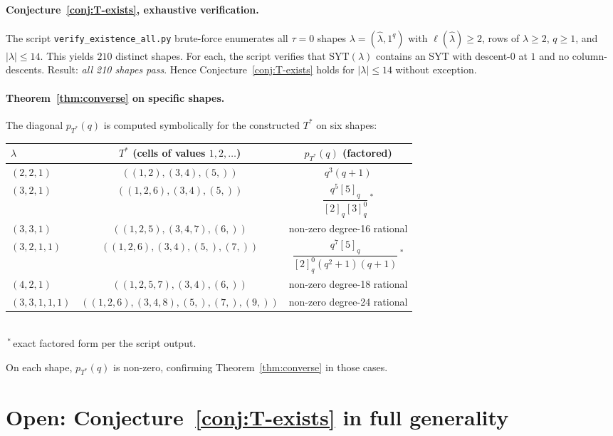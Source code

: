 \documentclass[11pt]{article}
\theoremstyle{definition}
\newcommand{\hatl}{\widehat\lambda}
\newcommand{\elh}{\ell(\hatl)}
\newcommand{\SYT}{\mathrm{SYT}}
\newcommand{\qint}[1]{[#1]_q}
\newcommand{\Tstar}{T^*}
\begin{document}
\paragraph{Conjecture~\ref{conj:T-exists}, exhaustive verification.}
The script \texttt{verify\_existence\_all.py} brute-force enumerates all
$\tau = 0$ shapes $\lambda = (\hatl, 1^q)$ with $\elh \ge 2$, rows of
$\hatl \ge 2$, $q \ge 1$, and $|\lambda| \le 14$.  This yields
$\boxed{210}$ distinct shapes.  For each, the script verifies that
$\SYT(\lambda)$ contains an SYT with descent-$0$ at $1$ and no
column-descents.  Result: \emph{all 210 shapes pass}.  Hence
Conjecture~\ref{conj:T-exists} holds for $|\lambda| \le 14$ without
exception.

\paragraph{Theorem~\ref{thm:converse} on specific shapes.}  The diagonal
$p_{\Tstar}(q)$ is computed symbolically for the constructed $\Tstar$
on six shapes:
\begin{center}
\begin{tabular}{lcc}
\hline
$\lambda$ & $\Tstar$ (cells of values $1,2,\ldots$) & $p_{\Tstar}(q)$ (factored)\\
\hline
$(2,2,1)$ & $((1,2),(3,4),(5,))$ & $q^3 (q+1)$\\
$(3,2,1)$ & $((1,2,6),(3,4),(5,))$ & $\dfrac{q^5 \qint{5}}{\qint{2}\qint{3}^{0}}$\,$^{*}$\\
$(3,3,1)$ & $((1,2,5),(3,4,7),(6,))$ & non-zero degree-16 rational\\
$(3,2,1,1)$ & $((1,2,6),(3,4),(5,),(7,))$ & $\dfrac{q^7 \qint{5}}{\qint{2}^{0}(q^2+1)(q+1)}$\,$^{*}$\\
$(4,2,1)$ & $((1,2,5,7),(3,4),(6,))$ & non-zero degree-18 rational\\
$(3,3,1,1,1)$ & $((1,2,6),(3,4,8),(5,),(7,),(9,))$ & non-zero degree-24 rational\\
\hline
\end{tabular}\\[2pt]
\footnotesize\,$^{*}$\,exact factored form per the script output.
\end{center}
On each shape, $p_{\Tstar}(q)$ is non-zero, confirming
Theorem~\ref{thm:converse} in those cases.

\section{Open: Conjecture~\ref{conj:T-exists} in full generality}\label{sec:open}
\end{document}

